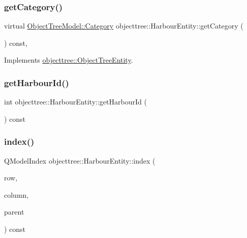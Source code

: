 \mbox{\label{classobjecttree_1_1_harbour_entity_aa9a65ed7043466958c0da886ed525af9}} 
\subsubsection{\texorpdfstring{getCategory()}{getCategory()}}
{\footnotesize\ttfamily virtual \mbox{\hyperlink{class_object_tree_model_a379e9d6b0d381853785adf62095ba4e3}{Object\+Tree\+Model\+::\+Category}} objecttree\+::\+Harbour\+Entity\+::get\+Category (\begin{DoxyParamCaption}{ }\end{DoxyParamCaption}) const\hspace{0.3cm}{\ttfamily [inline]}, {\ttfamily [virtual]}}



Implements \mbox{\hyperlink{classobjecttree_1_1_object_tree_entity_aa4e80e7fa80672c1b9902add665abc77}{objecttree\+::\+Object\+Tree\+Entity}}.

\mbox{\label{classobjecttree_1_1_harbour_entity_a9d632d259a60d7ff224966186e3e47cc}} 
\subsubsection{\texorpdfstring{getHarbourId()}{getHarbourId()}}
{\footnotesize\ttfamily int objecttree\+::\+Harbour\+Entity\+::get\+Harbour\+Id (\begin{DoxyParamCaption}{ }\end{DoxyParamCaption}) const\hspace{0.3cm}{\ttfamily [inline]}}

\mbox{\label{classobjecttree_1_1_harbour_entity_a70b27c05c76b447a183c05a1318e96ee}} 
\subsubsection{\texorpdfstring{index()}{index()}}
{\footnotesize\ttfamily Q\+Model\+Index objecttree\+::\+Harbour\+Entity\+::index (\begin{DoxyParamCaption}\item[{int}]{row,  }\item[{int}]{column,  }\item[{const Q\+Model\+Index \&}]{parent }\end{DoxyParamCaption}) const\hspace{0.3cm}{\ttfamily [virtual]}}



